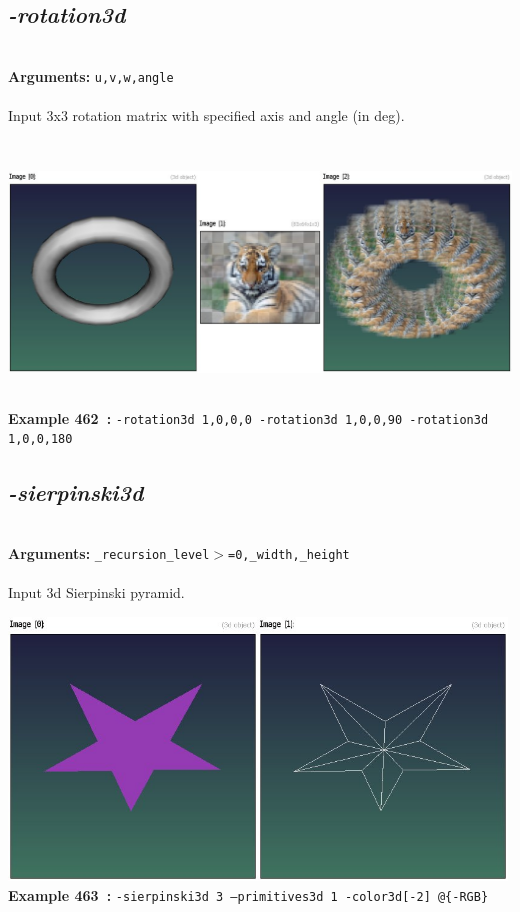 \documentclass[a4paper,11pt,twoside]{book}
\begin{document}
\subsection{\emph{-rotation3d} }\vspace*{-0.5em}
~\\\textbf{Arguments: } 
{\small \texttt{u,v,w,angle}}\\~\\
Input 3x3 rotation matrix with specified axis and angle (in deg).
\begin{center}\includegraphics[keepaspectratio=true,height=7cm,width=\textwidth]{img/gmic_def462.jpg}\\
{\footnotesize \textbf{Example 462~:} \texttt{-rotation3d 1,0,0,0 -rotation3d 1,0,0,90 -rotation3d 1,0,0,180}}
\end{center}

\subsection{\emph{-sierpinski3d} }\vspace*{-0.5em}
~\\\textbf{Arguments: } 
{\small \texttt{\_recursion\_level$>$=0,\_width,\_height}}\\~\\
Input 3d Sierpinski pyramid.
\begin{center}\includegraphics[keepaspectratio=true,height=7cm,width=\textwidth]{img/gmic_def463.jpg}\\
{\footnotesize \textbf{Example 463~:} \texttt{-sierpinski3d 3 --primitives3d 1 -color3d[-2] @\{-RGB\}}}
\end{center}
\end{document}
